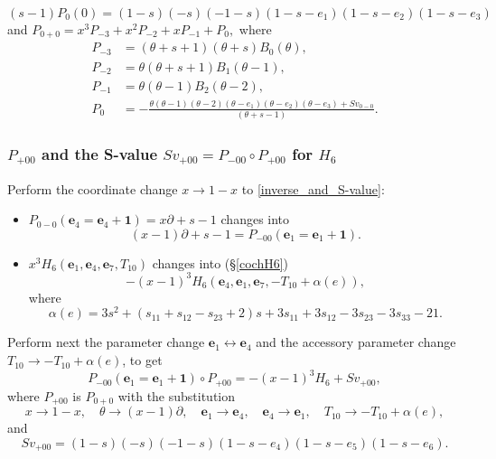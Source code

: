 \documentclass[a4paper,12pt]{article}
\theoremstyle{definition}
\theoremstyle{remark}
\numberwithin{equation}{section} %
\def\comment#1{ }
\begin{document}
$$(s-1)P_0(0)=(1-s)(-s)(-1-s)(1-s-e_1)(1-s-e_2)(1-s-e_3)$$
and $P_{0+0}=x^3P_{-3}+x^2P_{-2}+xP_{-1}+P_0,$ where
$$\begin{array}{ll} 
P_{-3}&=(\theta+s+1)(\theta+s)B_0(\theta),\\
P_{-2}&=\theta(\theta+s+1)B_1(\theta-1),\\
P_{-1}&=\theta(\theta-1)B_2(\theta-2),\\
P_0&=\displaystyle{-\frac{\theta(\theta-1)(\theta-2)(\theta-e_1)(\theta-e_2)(\theta-e_3)+Sv_{0-0}}{(\theta+s-1)}}.
\end{array}$$
\comment{
Thus we got
\begin{equation}\label{inverse_and_S-value}
  P_{0-0}({\bm e}_4={\bm e}_4+{\bm 1})\circ P_{0+0}=x^3H_6+Sv_{0+0},\end{equation}
where $P_{0-0}({\bm e}_4={\bm e}_4+{\bm 1})=\theta+s-1$.
}
\newpage
\subsubsection{$P_{+00}$ and the S-value $Sv_{+00}=P_{-00}\circ P_{+00}$ for $H_6$}\label{P_p00}
Perform the coordinate change $x\to1-x$ to \eqref{inverse_and_S-value}:
\begin{itemize}
  \item $P_{0-0}({\bm e}_4={\bm e}_4+{\bm 1})=x\partial+s-1$ changes into
    $$(x-1)\partial +s-1=P_{-00}({\bm e}_1={\bm e}_1+{\bm 1}).$$
  \item
    $x^3H_6({\bm e}_1,{\bm e}_4,{\bm e}_7,T_{10})$ changes into (\S \ref{cochH6})
    $$-(x-1)^3H_6({\bm e}_4,{\bm e}_1,{\bm e}_7,-T_{10}+\alpha(e)),$$
   where 
   $$\alpha(e)=3s^2+(s_{11}+s_{12}-s_{23}+2)s+3s_{11}+3s_{12}-3s_{23}-3s_{33}-21.$$
    \end{itemize}
   Perform next the parameter change ${\bm e}_1\leftrightarrow{\bm e}_4$ and the accessory parameter change $T_{10}\to -T_{10}+\alpha(e)$, to get
      $$ P_{-00}({\bm e}_1={\bm e}_1+{\bm 1})\circ P_{+00}=-(x-1)^3H_6+Sv_{+00},$$
   where $P_{+00}$ is $P_{0+0}$ with the substitution
   $$x\to1-x,\quad \theta\to (x-1)\partial,\quad {\bm e}_1\to {\bm e}_4,\quad{\bm e}_4\to {\bm e}_1,\quad T_{10}\to -T_{10}+\alpha(e),$$
   and
   $$Sv_{+00}=(1-s)(-s)(-1-s)(1-s-e_4)(1-s-e_5)(1-s-e_6).$$
\end{document}
